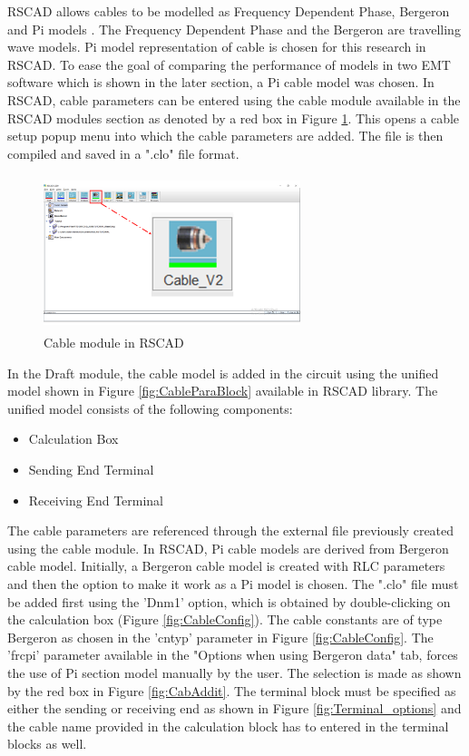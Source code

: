 RSCAD allows cables to be modelled as Frequency Dependent Phase, Bergeron and Pi models \cite{rtds_tech}. The Frequency Dependent Phase and the Bergeron are travelling wave models. Pi model representation of cable is chosen for this research in RSCAD. To ease the goal of comparing the performance of models in two \gls{EMT} software which is shown in the later section, a Pi cable model was chosen. In RSCAD, cable parameters can be entered using the cable module available in the RSCAD modules section as denoted by a red box in Figure \ref{fig:CableModule_mark}. This opens a cable setup popup menu into which the cable parameters are added. The file is then compiled and saved in a ".clo" file format. 
\begin{figure}[H]
\centering
    \includegraphics[height = 4.5cm,width = 7.5cm]{Diagrams/Chapter_3/Cable_module_Final.png}
    \caption{Cable module in RSCAD}
    \label{fig:CableModule_mark}
\end{figure}

In the Draft module, the cable model is added in the circuit using the unified model shown in Figure \ref{fig:CableParaBlock} available in RSCAD library. The unified model consists of the following components: 
    \begin{itemize}[noitemsep]
    \item Calculation Box
    \item Sending End Terminal
    \item Receiving End Terminal
\end{itemize}

The cable parameters are referenced through the external file previously created using the cable module. In RSCAD, Pi cable models are derived from Bergeron cable model. Initially, a Bergeron cable model is created with RLC parameters and then the option to make it work as a Pi model is chosen. The ".clo" file must be added first using the 'Dnm1' option, which is obtained by double-clicking on the calculation box (Figure \ref{fig:CableConfig}). The cable constants are of type Bergeron as chosen in the 'cntyp' parameter in Figure \ref{fig:CableConfig}. The 'frcpi' parameter available in the "Options when using Bergeron data" tab, forces the use of Pi section model manually by the user. The selection is made as shown by the red box in Figure \ref{fig:CabAddit}. The terminal block must be specified as either the sending or receiving end as shown in Figure \ref{fig:Terminal_options} and the cable name provided in the calculation block has to entered in the terminal blocks as well.\\

